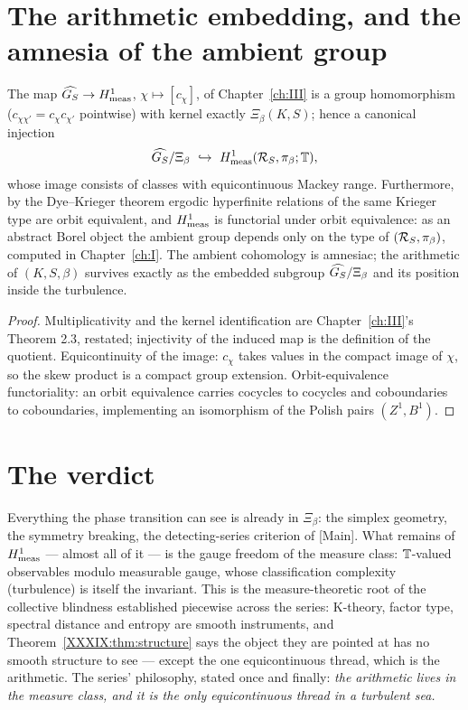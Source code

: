 \section{The arithmetic embedding, and the amnesia of the ambient group}\label{XXXIX:sec:embedding}

\begin{theorem}\label{XXXIX:thm:embed}
The map $\widehat{G_S}\to H^1_{\mathrm{meas}}$, $\chi\mapsto[c_\chi]$, of Chapter~\ref{ch:III} is a group homomorphism
($c_{\chi\chi'}=c_\chi c_{\chi'}$ pointwise) with kernel exactly $\Xi_\beta(K,S)$; hence
a canonical injection
\[
\GS/\Xi_\beta\ \hookrightarrow\ \Hmeas(\R_S,\pi_\beta;\T),
\]
whose image consists of classes with equicontinuous Mackey range. Furthermore, by the
Dye--Krieger theorem \cite{Dye} ergodic hyperfinite relations of the same Krieger type
are orbit equivalent, and $H^1_{\mathrm{meas}}$ is functorial under orbit equivalence: as an abstract
Borel object the ambient group depends only on the type of $(\mathcal{R}_S,\pi_\beta)$, computed
in Chapter~\ref{ch:I}. The ambient cohomology is amnesiac; the arithmetic of $(K,S,\beta)$ survives
exactly as the embedded subgroup $\widehat{G_S}/\Xi_\beta$ and its position inside the turbulence.
\end{theorem}

\begin{proof}
Multiplicativity and the kernel identification are Chapter~\ref{ch:III}'s Theorem 2.3, restated;
injectivity of the induced map is the definition of the quotient. Equicontinuity of the
image: $c_\chi$ takes values in the compact image of $\chi$, so the skew product is a
compact group extension. Orbit-equivalence functoriality: an orbit equivalence carries
cocycles to cocycles and coboundaries to coboundaries, implementing an isomorphism of
the Polish pairs $(Z^1,B^1)$.
\end{proof}

\section{The verdict}\label{XXXIX:sec:verdict}

Everything the phase transition can see is already in $\Xi_\beta$: the simplex geometry,
the symmetry breaking, the detecting-series criterion of [Main]. What remains of
$H^1_{\mathrm{meas}}$ --- almost all of it --- is the gauge freedom of the measure class:
$\mathbb{T}$-valued observables modulo measurable gauge, whose classification complexity
(turbulence) is itself the invariant. This is the measure-theoretic root of the
collective blindness established piecewise across the series: K-theory, factor type,
spectral distance and entropy are smooth instruments, and Theorem~\ref{XXXIX:thm:structure}
says the object they are pointed at has no smooth structure to see --- except the one
equicontinuous thread, which is the arithmetic. The series' philosophy, stated once and
finally: \emph{the arithmetic lives in the measure class, and it is the only
equicontinuous thread in a turbulent sea.}

